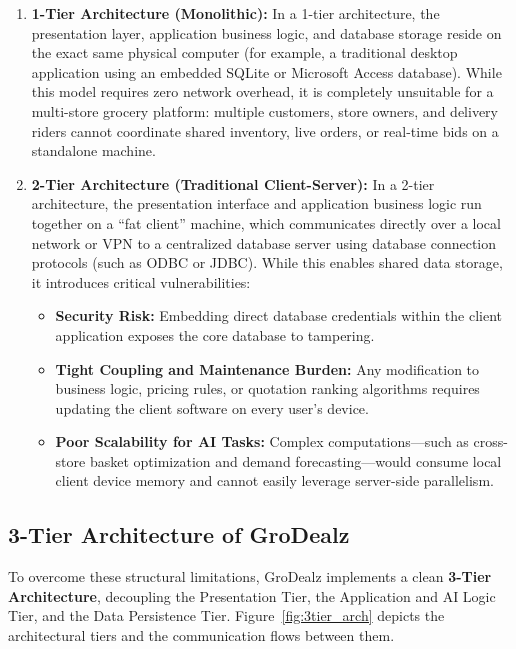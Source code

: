 \begin{enumerate}
    \item \textbf{1-Tier Architecture (Monolithic):} In a 1-tier architecture, the presentation layer, application business logic, and database storage reside on the exact same physical computer (for example, a traditional desktop application using an embedded SQLite or Microsoft Access database). While this model requires zero network overhead, it is completely unsuitable for a multi-store grocery platform: multiple customers, store owners, and delivery riders cannot coordinate shared inventory, live orders, or real-time bids on a standalone machine.
    \item \textbf{2-Tier Architecture (Traditional Client-Server):} In a 2-tier architecture, the presentation interface and application business logic run together on a ``fat client'' machine, which communicates directly over a local network or VPN to a centralized database server using database connection protocols (such as ODBC or JDBC). While this enables shared data storage, it introduces critical vulnerabilities:
    \begin{itemize}
        \item \textbf{Security Risk:} Embedding direct database credentials within the client application exposes the core database to tampering.
        \item \textbf{Tight Coupling and Maintenance Burden:} Any modification to business logic, pricing rules, or quotation ranking algorithms requires updating the client software on every user's device.
        \item \textbf{Poor Scalability for AI Tasks:} Complex computations---such as cross-store basket optimization and demand forecasting---would consume local client device memory and cannot easily leverage server-side parallelism.
    \end{itemize}
\end{enumerate}

\subsection{3-Tier Architecture of GroDealz}

To overcome these structural limitations, GroDealz implements a clean \textbf{3-Tier Architecture}, decoupling the Presentation Tier, the Application and AI Logic Tier, and the Data Persistence Tier. Figure~\ref{fig:3tier_arch} depicts the architectural tiers and the communication flows between them.


